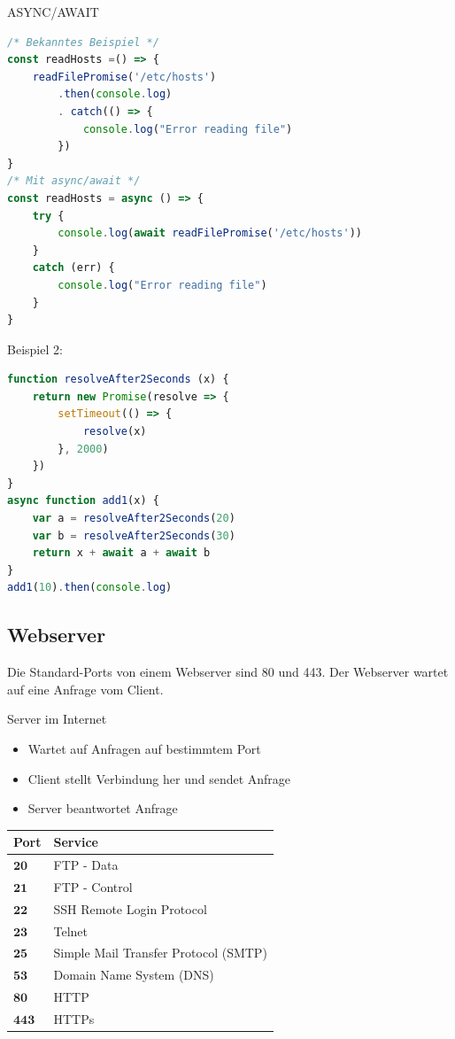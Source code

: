 \begin{code}{ASYNC/AWAIT}
\begin{lstlisting}[language=JavaScript, style=base]
/* Bekanntes Beispiel */
const readHosts =() => {
    readFilePromise('/etc/hosts')
        .then(console.log)
        . catch(() => {
            console.log("Error reading file")
        })
}
/* Mit async/await */
const readHosts = async () => {
    try {
        console.log(await readFilePromise('/etc/hosts'))
    }
    catch (err) {
        console.log("Error reading file")
    }
}
\end{lstlisting}
Beispiel 2:
\begin{lstlisting}[language=JavaScript, style=base]
function resolveAfter2Seconds (x) {
    return new Promise(resolve => {
        setTimeout(() => {
            resolve(x)
        }, 2000)
    })
}
async function add1(x) {
    var a = resolveAfter2Seconds(20)
    var b = resolveAfter2Seconds(30)
    return x + await a + await b
}
add1(10).then(console.log)
\end{lstlisting}
\end{code}

\subsection{Webserver}
Die Standard-Ports von einem Webserver sind 80 und 443. Der Webserver wartet auf eine Anfrage vom Client.

\begin{definition}{Server im Internet}
\begin{itemize}
  \item Wartet auf Anfragen auf bestimmtem Port
  \item Client stellt Verbindung her und sendet Anfrage
  \item Server beantwortet Anfrage
\end{itemize}
\begin{center}
\begin{tabular}{|l|l|}
\hline
Port & Service \\
\hline
$\mathbf{2 0}$ & FTP - Data \\
\hline
$\mathbf{2 1}$ & FTP - Control \\
\hline
$\mathbf{2 2}$ & SSH Remote Login Protocol \\
\hline
$\mathbf{2 3}$ & Telnet \\
\hline
$\mathbf{2 5}$ & Simple Mail Transfer Protocol (SMTP) \\
\hline
$\mathbf{5 3}$ & Domain Name System (DNS) \\
\hline
$\mathbf{8 0}$ & HTTP \\
\hline
$\mathbf{4 4 3}$ & HTTPs \\
\hline
\end{tabular}
\end{center}
\end{definition}

